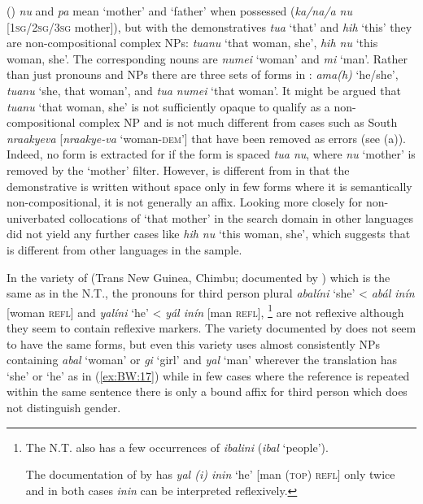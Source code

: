 \documentclass[output=collectionpaper]{langsci/langscibook}
\begin{document}
 () \textit{nu} and \textit{pa} mean ‘mother’ and ‘father’ when possessed (\textit{ka/na/a nu} [\textsc{1sg/2sg/3sg} mother]), but with the demonstratives \textit{tua} ‘that’ and \textit{hih} ‘this’ they are non-compositional complex NPs: \textit{tuanu} ‘that woman, she’, \textit{hih nu} ‘this woman, she’. The corresponding nouns are \textit{numei} ‘woman’ and \textit{mi} ‘man’. Rather than just pronouns and NPs there are three sets of forms in : \textit{ama(h)} ‘he/she’, \textit{tuanu} ‘she, that woman’, and \textit{tua numei} ‘that woman’. It might be argued that \textit{tuanu} ‘that woman, she’ is not sufficiently opaque to qualify as a non-compositional complex NP and is not much different from cases such as South  \textit{nraakyeva} [\textit{nraakye-va} ‘woman-\textsc{dem}'] that have been removed as errors (see (a)). Indeed, no form is extracted for  if the form is spaced \textit{tua nu}, where \textit{nu} ‘mother’ is removed by the ‘mother’ filter. However,  is different from  in that the demonstrative is written without space only in few forms where it is semantically non-compositional, it is not generally an affix. Looking more closely for non-univerbated collocations of ‘that mother’ in the search domain in other  languages did not yield any further cases like  \textit{hih nu} ‘this woman, she’, which suggests that  is different from other  languages in the sample.

In the variety of  (Trans New Guinea, Chimbu; documented by \citet[55]{Bunn1974}) which is the same as in the N.T., the pronouns for third person plural \textit{abalíni} ‘she’ < \textit{abál inín} [woman \textsc{refl}] and \textit{yalíni} ‘he’ < \textit{yál inín} [man \textsc{refl}],%
\footnote{%
The N.T. also has a few occurrences of \textit{ibalini} (\textit{ibal} ‘people’).

The documentation of  by \citet{Evans2005} has \textit{yal (i) inin} ‘he’ [man \textsc{(top) refl}] only twice and in both cases \textit{inin} can be interpreted reflexively.
} %
are not reflexive although they seem to contain reflexive markers. The variety documented by \citet{Evans2005} does not seem to have the same forms, but even this variety uses almost consistently NPs containing \textit{abal} ‘woman’ or \textit{gi} ‘girl’ and \textit{yal} ‘man’ wherever the  translation has ‘she’ or ‘he’ as in (\ref{ex:BW:17}) while in few cases where the reference is repeated within the same sentence there is only a bound affix for third person which does not distinguish gender.
\end{document}
